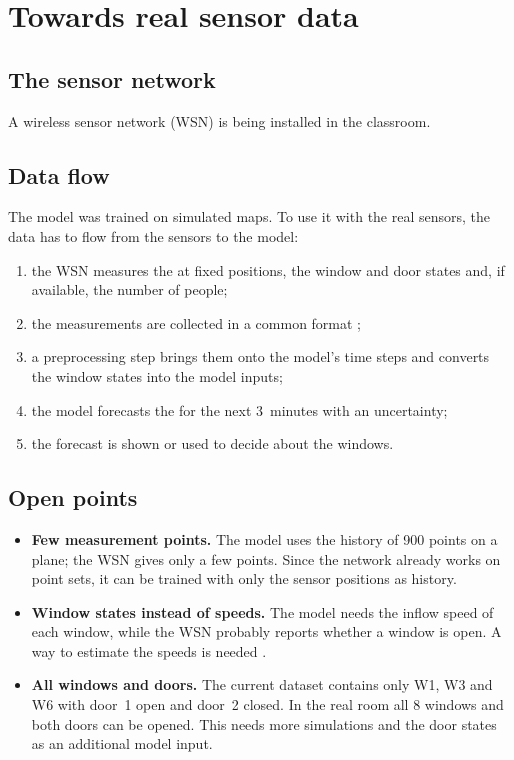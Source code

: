 \chapter{Towards real sensor data}
\label{ch:sensors}

\section{The sensor network}
A wireless sensor network (WSN) is being installed in the classroom. 

\section{Data flow}
The model was trained on simulated \cotwo{} maps. To use it with the real sensors, the data has to flow from the
sensors to the model:
\begin{enumerate}
  \item the WSN measures the \cotwo{} at fixed positions, the window and door states and, if available, the number
        of people;
  \item the measurements are collected in a common format ;
  \item a preprocessing step brings them onto the model's time steps and converts the window states into the
        model inputs;
  \item the model forecasts the \cotwo{} for the next 3~minutes with an uncertainty;
  \item the forecast is shown or used to decide about the windows.
\end{enumerate}

\section{Open points}
\begin{itemize}
  \item \textbf{Few measurement points.} The model uses the \cotwo{} history of 900 points on a plane; the WSN
        gives only a few points. Since the network already works on point sets, it can be trained with only the
        sensor positions as history.
  \item \textbf{Window states instead of speeds.} The model needs the inflow speed of each window, while the WSN
        probably reports whether a window is open. A way to estimate the speeds is needed .
  \item \textbf{All windows and doors.} The current dataset contains only W1, W3 and W6 with door~1 open and
        door~2 closed. In the real room all 8 windows and both doors can be opened. This needs more simulations and
        the door states as an additional model input.
\end{itemize}

